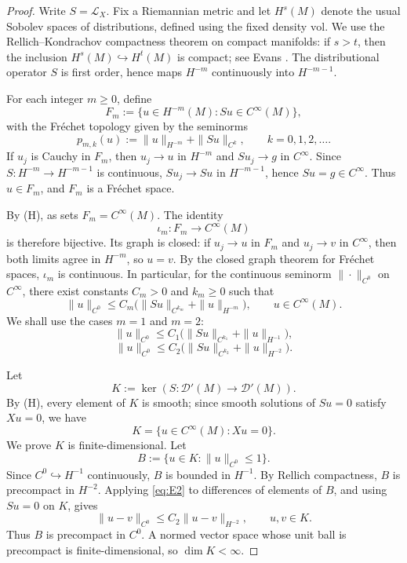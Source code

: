 \documentclass[12pt]{article}
\theoremstyle{definition}
\newcommand{\D}{\mathcal{D}}
\newcommand{\vol}{\mathrm{vol}}
\begin{document}
\begin{proof}
Write \(S=\mathcal L_X\).  Fix a Riemannian metric and let \(H^s(M)\) denote the usual Sobolev spaces of distributions, defined using the fixed density \(\vol\).  We use the Rellich--Kondrachov compactness theorem on compact manifolds: if \(s>t\), then the inclusion \(H^s(M)\hookrightarrow H^t(M)\) is compact; see Evans \cite[Theorem 5.7.1]{Evans}.  The distributional operator \(S\) is first order, hence maps \(H^{-m}\) continuously into \(H^{-m-1}\).

For each integer \(m\ge 0\), define
\[
F_m:=\{u\in H^{-m}(M):S u\in C^\infty(M)\},
\]
with the Fr\'echet topology given by the seminorms
\[
p_{m,k}(u):=\|u\|_{H^{-m}}+\|S u\|_{C^k},
\qquad k=0,1,2,\dots .
\]
If \(u_j\) is Cauchy in \(F_m\), then \(u_j\to u\) in \(H^{-m}\) and \(S u_j\to g\) in \(C^\infty\).  Since \(S:H^{-m}\to H^{-m-1}\) is continuous, \(S u_j\to S u\) in \(H^{-m-1}\), hence \(S u=g\in C^\infty\).  Thus \(u\in F_m\), and \(F_m\) is a Fr\'echet space.

By (H), as sets \(F_m=C^\infty(M)\).  The identity
\[
\iota_m:F_m\to C^\infty(M)
\]
is therefore bijective.  Its graph is closed: if \(u_j\to u\) in \(F_m\) and \(u_j\to v\) in \(C^\infty\), then both limits agree in \(H^{-m}\), so \(u=v\).  By the closed graph theorem for Fr\'echet spaces, \(\iota_m\) is continuous.  In particular, for the continuous seminorm \(\|\cdot\|_{C^0}\) on \(C^\infty\), there exist constants \(C_m>0\) and \(k_m\ge 0\) such that
\[
\|u\|_{C^0}
\le
C_m\bigl(\|S u\|_{C^{k_m}}+\|u\|_{H^{-m}}\bigr),
\qquad u\in C^\infty(M).
\]
We shall use the cases \(m=1\) and \(m=2\):
\begin{equation}\label{eq:E1}
\|u\|_{C^0}
\le
C_1\bigl(\|S u\|_{C^{k_1}}+\|u\|_{H^{-1}}\bigr),
\end{equation}
\begin{equation}\label{eq:E2}
\|u\|_{C^0}
\le
C_2\bigl(\|S u\|_{C^{k_2}}+\|u\|_{H^{-2}}\bigr).
\end{equation}

Let
\[
K:=\ker(S:\D'(M)\to \D'(M)).
\]
By (H), every element of \(K\) is smooth; since smooth solutions of \(S u=0\) satisfy \(Xu=0\), we have
\[
K=\{u\in C^\infty(M):Xu=0\}.
\]
We prove \(K\) is finite-dimensional.  Let
\[
B:=\{u\in K:\|u\|_{C^0}\le 1\}.
\]
Since \(C^0\hookrightarrow H^{-1}\) continuously, \(B\) is bounded in \(H^{-1}\).  By Rellich compactness, \(B\) is precompact in \(H^{-2}\).  Applying \eqref{eq:E2} to differences of elements of \(B\), and using \(S u=0\) on \(K\), gives
\[
\|u-v\|_{C^0}
\le
C_2\|u-v\|_{H^{-2}},
\qquad u,v\in K.
\]
Thus \(B\) is precompact in \(C^0\).  A normed vector space whose unit ball is precompact is finite-dimensional, so \(\dim K<\infty\).


\end{proof}
\end{document}
